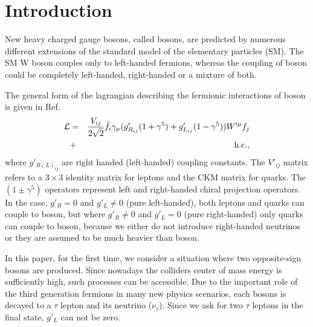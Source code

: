 
\section{Introduction}\label{sec:int} 


New heavy charged gauge bosons, called \wprime bosons, are predicted by numerous different extensions of the standard model of the elementary particles (SM). 
The SM W boson couples only to left-handed fermions, whereas the coupling of \wprime boson could be completely left-handed, right-handed or a mixture of both. 

The general form of the lagrangian describing the fermionic interactions of \wprime boson is given in  Ref.~\cite{Sullivan:2002jt}
\begin{eqnarray}
{\cal L}& =& \frac{V_{ij}}{2\sqrt{2}}\bar{f_i} \gamma_{\mu}(g^\prime_{R_{ij}} (1+{\gamma}^5)+
g^\prime_{L_{ij}}
(1-{\gamma}^5)) W^{\prime \mu} f_j  \nonumber\\
&+& \mathrm{h.c.},
\end{eqnarray}
where $g'_{R(L)_{ij}}$ are right handed (left-handed) coupling constants. The $V'_{ij}$ matrix refers to a $3\times3$ identity matrix for leptons and the CKM matrix for quarks. The $(1\pm{\gamma^5})$ operators represent left and right-handed chiral projection operators. In the case, $g'_R = 0$ and $g'_L \neq 0$ (pure left-handed), both leptons and quarks can couple to \wprime boson, but where $g'_R \neq 0$ and $g'_L = 0$ (pure right-handed) only quarks can couple to \wprime boson, because we either do not introduce right-handed neutrinos or they are assumed to be much heavier than \wprime boson. 

In this paper, for the first time, we consider a situation where two opposite-sign \wprime bosons are produced. Since nowadays the colliders center of mass energy is sufficiently high, such processes can be accessible. Due to the important role of the third generation fermions in many new physics scenarios, each \wprime bosons is decayed to a $\tau$ lepton and its neutrino ($\nu_{\tau}$). 
Since we ask for two $\tau$ leptons in the final state, $g'_L$ can not be zero. 

